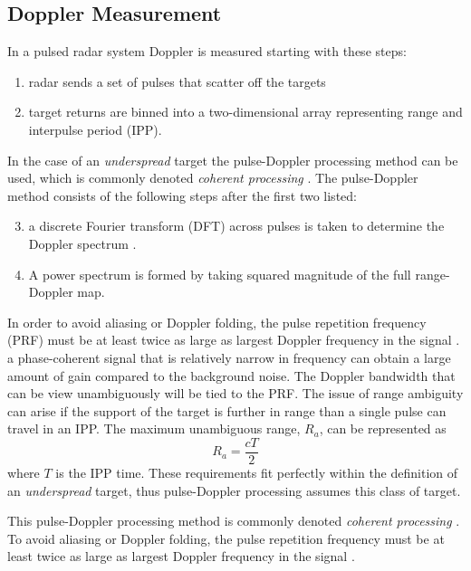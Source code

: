 \subsection{Doppler Measurement}
In a pulsed radar system Doppler is measured starting with these steps:
\begin{enumerate}
\label{list:uno}
\item radar sends a set of pulses that scatter off the targets 
\item target returns are binned into a two-dimensional array representing range and interpulse period (IPP).
\end{enumerate}
In the case of an \textit{underspread} target the pulse-Doppler processing method can be used, which is commonly denoted \textit{coherent processing} \cite{richards2014fundamentals,richards2010principles,richards2014principles,skolnik2008radar}. The pulse-Doppler method consists of the following steps after the first two listed:
\begin{enumerate}
  \setcounter{enumi}{2}
  \item a discrete Fourier transform (DFT) across pulses is taken to determine the Doppler spectrum \cite{richards2014fundamentals}. 
\item A power spectrum is formed by taking squared magnitude of the full range-Doppler map.  
\end{enumerate}

In order to avoid aliasing or Doppler folding, the pulse repetition frequency (PRF) must be at least twice as large as largest Doppler frequency in the signal \cite{dtsp:openhiem}. 
a phase-coherent signal that is relatively narrow in frequency can obtain a large amount of gain compared to the background noise. The Doppler bandwidth that can be view unambiguously will be tied to the PRF. The issue of range ambiguity can arise if the support of the target is further in range than a single pulse can travel in an IPP. The maximum unambiguous range, $R_a$, can be represented as 
\begin{equation}
\label{eqn:maxuar}
R_a =  \frac{cT}{2}
\end{equation}
where $T$ is the IPP time. These requirements fit perfectly within the definition of an  \textit{underspread} target, thus pulse-Doppler processing assumes this class of target.



This pulse-Doppler processing method is commonly denoted \textit{coherent processing} \cite{richards2014fundamentals,richards2010principles,richards2014principles,skolnik2008radar}.
To avoid aliasing or Doppler folding, the pulse repetition frequency must be at least twice as large as largest Doppler frequency in the signal \cite{dtsp:openhiem}. 

